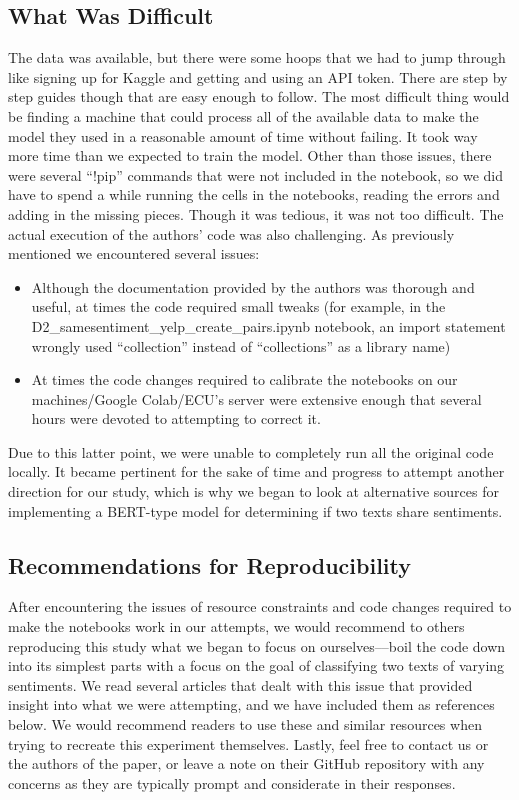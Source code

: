 \documentclass[conference]{IEEEtran}
\begin{document}
\subsection{What Was Difficult}
	The data was available, but there were some hoops that we had to jump through like signing up for Kaggle and getting and using an API token. There are step by step guides though that are easy enough to follow. The most difficult thing would be finding a machine that could process all of the available data to make the model they used in a reasonable amount of time without failing.  It took way more time than we expected to train the model.
	Other than those issues, there were several “!pip” commands that were not included in the notebook, so we did have to spend a while running the cells in the notebooks, reading the errors and adding in the missing pieces. Though it was tedious, it was not too difficult.
	The actual execution of the authors’ code was also challenging. As previously mentioned we encountered several issues:
\begin{itemize}
\item{Although the documentation provided by the authors was thorough and useful, at times the code required small tweaks (for example, in the D2\_samesentiment\_yelp\_create\_pairs.ipynb notebook, an import statement wrongly used “collection” instead of “collections” as a library name)}
\item{At times the code changes required to calibrate the notebooks on our machines/Google Colab/ECU’s server were extensive enough that several hours were devoted to attempting to correct it.}
\end{itemize}
	Due to this latter point, we were unable to completely run all the original code locally. It became pertinent for the sake of time and progress to attempt another direction for our study, which is why we began to look at alternative sources for implementing a BERT-type model for determining if two texts share sentiments.

\subsection{Recommendations for Reproducibility}
	After encountering the issues of resource constraints and code changes required to make the notebooks work in our attempts, we would recommend to others reproducing this study what we began to focus on ourselves--–boil the code down into its simplest parts with a focus on the goal of classifying two texts of varying sentiments.
	We read several articles that dealt with this issue that provided insight into what we were attempting, and we have included them as references below. We would recommend readers to use these and similar resources when trying to recreate this experiment themselves.
Lastly, feel free to contact us or the authors of the paper, or leave a note on their GitHub repository with any concerns as they are typically prompt and considerate in their responses. 
\end{document}
